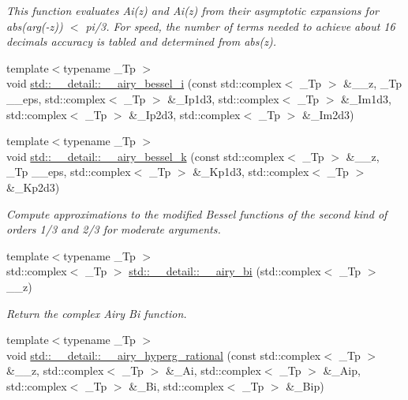 \begin{DoxyCompactItemize}
\begin{DoxyCompactList}\small\item\em This function evaluates Ai(z) and Ai\textquotesingle{}(z) from their asymptotic expansions for abs(arg(-\/z)) $<$ pi/3. For speed, the number of terms needed to achieve about 16 decimals accuracy is tabled and determined from abs(z). \end{DoxyCompactList}\item 
{\footnotesize template$<$typename \+\_\+\+Tp $>$ }\\void \hyperlink{namespacestd_1_1____detail_aee6c743187765ce9a1f9c4c9af4acf17}{std\+::\+\_\+\+\_\+detail\+::\+\_\+\+\_\+airy\+\_\+bessel\+\_\+i} (const std\+::complex$<$ \+\_\+\+Tp $>$ \&\+\_\+\+\_\+z, \+\_\+\+Tp \+\_\+\+\_\+eps, std\+::complex$<$ \+\_\+\+Tp $>$ \&\+\_\+\+Ip1d3, std\+::complex$<$ \+\_\+\+Tp $>$ \&\+\_\+\+Im1d3, std\+::complex$<$ \+\_\+\+Tp $>$ \&\+\_\+\+Ip2d3, std\+::complex$<$ \+\_\+\+Tp $>$ \&\+\_\+\+Im2d3)
\item 
{\footnotesize template$<$typename \+\_\+\+Tp $>$ }\\void \hyperlink{namespacestd_1_1____detail_a01098dbe1615b5be0833a7f3573f6510}{std\+::\+\_\+\+\_\+detail\+::\+\_\+\+\_\+airy\+\_\+bessel\+\_\+k} (const std\+::complex$<$ \+\_\+\+Tp $>$ \&\+\_\+\+\_\+z, \+\_\+\+Tp \+\_\+\+\_\+eps, std\+::complex$<$ \+\_\+\+Tp $>$ \&\+\_\+\+Kp1d3, std\+::complex$<$ \+\_\+\+Tp $>$ \&\+\_\+\+Kp2d3)
\begin{DoxyCompactList}\small\item\em Compute approximations to the modified Bessel functions of the second kind of orders 1/3 and 2/3 for moderate arguments. \end{DoxyCompactList}\item 
{\footnotesize template$<$typename \+\_\+\+Tp $>$ }\\std\+::complex$<$ \+\_\+\+Tp $>$ \hyperlink{namespacestd_1_1____detail_ae5536305d721e393efe1a74f0e57653e}{std\+::\+\_\+\+\_\+detail\+::\+\_\+\+\_\+airy\+\_\+bi} (std\+::complex$<$ \+\_\+\+Tp $>$ \+\_\+\+\_\+z)
\begin{DoxyCompactList}\small\item\em Return the complex Airy Bi function. \end{DoxyCompactList}\item 
{\footnotesize template$<$typename \+\_\+\+Tp $>$ }\\void \hyperlink{namespacestd_1_1____detail_aedc8a8cc144aa56f72728db7d62e3e62}{std\+::\+\_\+\+\_\+detail\+::\+\_\+\+\_\+airy\+\_\+hyperg\+\_\+rational} (const std\+::complex$<$ \+\_\+\+Tp $>$ \&\+\_\+\+\_\+z, std\+::complex$<$ \+\_\+\+Tp $>$ \&\+\_\+\+Ai, std\+::complex$<$ \+\_\+\+Tp $>$ \&\+\_\+\+Aip, std\+::complex$<$ \+\_\+\+Tp $>$ \&\+\_\+\+Bi, std\+::complex$<$ \+\_\+\+Tp $>$ \&\+\_\+\+Bip)

\end{DoxyCompactItemize}
